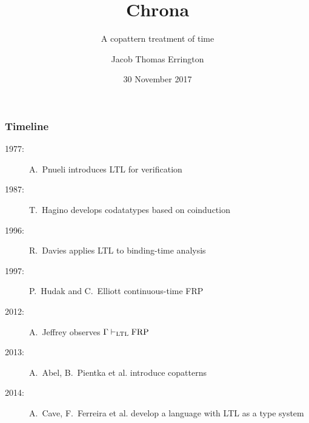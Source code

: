 \documentclass[serif,mathserif]{beamer}
\title[Chrona]{Chrona}
\subtitle{%
  A copattern treatment of time
}
\author{Jacob Thomas Errington}
\date{30 November 2017}
\begin{document}
\frame{\titlepage}


\begin{frame}
  \frametitle{Timeline}

  \begin{description}
    \item[1977:]
      A.~Pnueli introduces LTL for verification
    \item[1987:]
      T.~Hagino develops codatatypes based on coinduction
    \item[1996:]
      R.~Davies applies LTL to binding-time analysis
    \item[1997:]
      P.~Hudak and C.~Elliott continuous-time FRP
    \item[2012:]
      A.~Jeffrey observes $\Gamma \vdash_\text{LTL} \text{FRP}$
    \item[2013:]
      A.~Abel, B.~Pientka et al. introduce copatterns
    \item[2014:]
      A.~Cave, F.~Ferreira et al. develop a language with LTL as a type system
  \end{description}
\end{frame}
\end{document}
